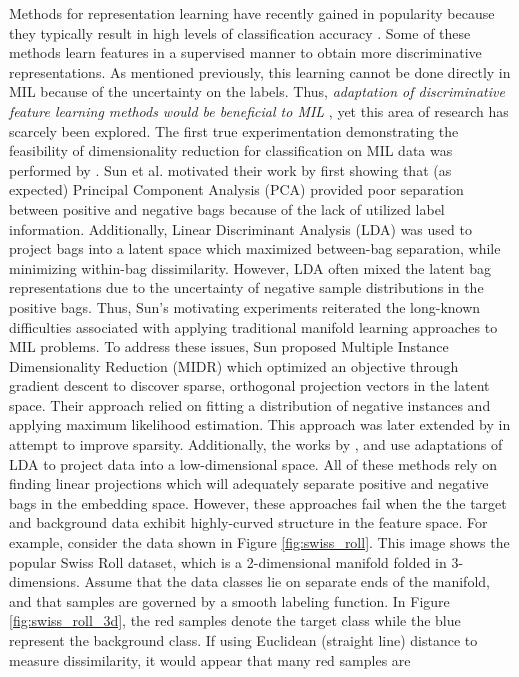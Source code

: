 Methods for representation learning have recently gained in popularity because they typically result in high levels of classification accuracy \citep{Bengio2014RepLearningReview}.  Some of these methods  learn features in a supervised manner to obtain more discriminative representations.  As mentioned previously, this learning cannot be done directly in  MIL because of the uncertainty on the labels.  Thus, \textit{adaptation of discriminative  feature learning methods would be beneficial to MIL} \citep{Carbonneau2016MILSurvey}, yet this area of research has scarcely been explored.  The first true experimentation demonstrating the feasibility of dimensionality reduction for classification on MIL data was performed by \cite{Sun2010MIDR}.  Sun et al. motivated their work by first showing that (as expected) Principal Component Analysis (PCA) provided poor separation between positive and negative bags because of the lack of utilized label information.  Additionally, Linear Discriminant Analysis (LDA) was used to project bags into a latent space which maximized between-bag separation, while minimizing within-bag dissimilarity.  However, LDA often mixed the latent bag representations due to the uncertainty of negative sample distributions in the positive bags.  Thus, Sun's motivating experiments  reiterated the long-known difficulties associated with applying traditional manifold learning approaches to MIL problems. To address these issues, Sun proposed Multiple Instance Dimensionality Reduction (MIDR) which optimized an objective through gradient descent to discover sparse, orthogonal projection vectors in the latent space.  Their approach relied on fitting a distribution of negative instances and applying maximum likelihood estimation.  This approach was later extended by \cite{Zhu2018MIDRSparsity} in attempt to improve sparsity.  Additionally, the works by \cite{Ping2010MILDRMaxMargin}, \cite{Kim2010LocalDRMIL} and \cite{Chai2014MIDA} use adaptations of LDA to project data into a low-dimensional space. All of these methods rely on finding linear projections which will adequately separate positive and negative bags in the embedding space.  However, these approaches fail when the the target and background data exhibit highly-curved structure in the feature space.  For example, consider the data shown in Figure \ref{fig:swiss_roll}.  This image shows the popular Swiss Roll dataset, which is a 2-dimensional manifold folded in 3-dimensions.  Assume that the data classes lie on separate ends of the manifold, and that samples are governed by a smooth labeling function.  In Figure \ref{fig:swiss_roll_3d}, the red samples denote the target class while the blue represent the background class.  If using Euclidean (straight line) distance to measure dissimilarity, it would appear that many red samples are 